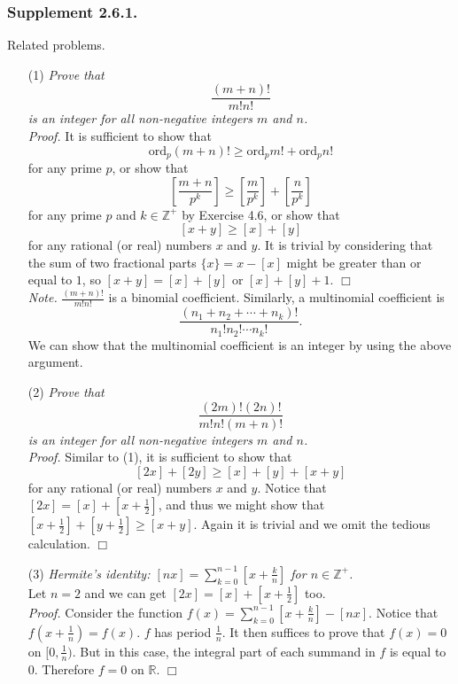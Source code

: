 \documentclass{article}
\begin{document}
\subsubsection*{Supplement 2.6.1.}
Related problems.
\begin{enumerate}
\item[(1)]
\emph{Prove that
$$\frac{(m + n)!}{m!n!}$$
is an integer for all non-negative integers $m$ and $n$.} \\

\emph{Proof.}
It is sufficient to show that
$$\text{ord}_p (m + n)! \geq \text{ord}_p m! + \text{ord}_p n!$$
for any prime $p$, or show that
$$\left[\frac{m + n}{p^k}\right]
\geq \left[\frac{m}{p^k}\right] + \left[\frac{n}{p^k}\right]$$
for any prime $p$ and $k \in \mathbb{Z}^+$ by Exercise 4.6, or show that
$$[x + y] \geq [x] + [y]$$
for any rational (or real) numbers $x$ and $y$.
It is trivial by considering that the sum of two fractional parts $\{x\} = x - [x]$
might be greater than or equal to $1$, so $[x + y] = [x] + [y]$ or $[x] + [y] + 1$.
$\Box$ \\

\emph{Note.}
$\frac{(m + n)!}{m!n!}$ is a binomial coefficient.
Similarly, a multinomial coefficient is
$$\frac{(n_1 + n_2 + \cdots + n_k)!}{n_1!n_2! \cdots n_k!}.$$
We can show that the multinomial coefficient is an integer
by using the above argument. \\

\item[(2)]
\emph{Prove that
$$\frac{(2m)!(2n)!}{m!n!(m + n)!}$$
is an integer for all non-negative integers $m$ and $n$.} \\

\emph{Proof.}
Similar to (1), it is sufficient to show that
$$[2x] + [2y] \geq [x] + [y] + [x + y]$$
for any rational (or real) numbers $x$ and $y$.
Notice that $[2x] = [x] + [x + \frac{1}{2}]$, and thus we might show that
$[x + \frac{1}{2}] + [y + \frac{1}{2}] \geq [x + y]$.
Again it is trivial and we omit the tedious calculation.
$\Box$ \\

\item[(3)]
\emph{Hermite's identity:
$[nx] = \sum_{k=0}^{n-1} [x + \frac{k}{n}]$ for $n \in \mathbb{Z}^+$.} \\

Let $n = 2$ and we can get $[2x] = [x] + [x + \frac{1}{2}]$ too. \\

\emph{Proof.}
Consider the function $f(x) = \sum_{k=0}^{n-1} [x + \frac{k}{n}] - [nx]$.
Notice that $f(x + \frac{1}{n}) = f(x)$. $f$ has period $\frac{1}{n}$.
It then suffices to prove that $f(x) = 0$ on $[0, \frac{1}{n})$.
But in this case, the integral part of each summand in $f$ is equal to $0$.
Therefore $f = 0$ on $\mathbb{R}$.
$\Box$ \\


\end{enumerate}
\end{document}
